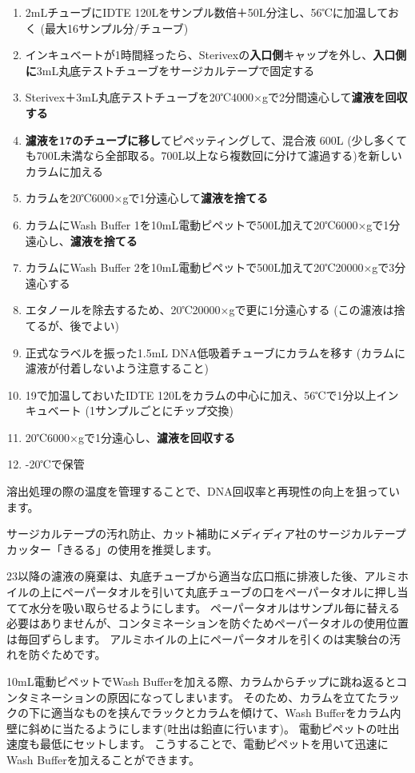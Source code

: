 \documentclass[titlepage,10pt,a4paper,uplatex]{jsbook}
\renewcommand{\textbf}[1]{{\bfseries\sffamily#1}}
\begin{document}
\begin{enumerate}
\item 2mLチューブにIDTE 120{\textmu}Lをサンプル数倍＋50{\textmu}L分注し、56℃に加温しておく (最大16サンプル分/チューブ)
\item インキュベートが1時間経ったら、Sterivexの\textbf{入口側}キャップを外し、\textbf{入口側に}3mL丸底テストチューブをサージカルテープで固定する
\item Sterivex＋3mL丸底テストチューブを20℃4000×gで2分間遠心して\textbf{濾液を回収する}
\item \textbf{濾液を17のチューブに移し}てピペッティングして、混合液 600{\textmu}L (少し多くても700{\textmu}L未満なら全部取る。700{\textmu}L以上なら複数回に分けて濾過する)を新しいカラムに加える
\item カラムを20℃6000×gで1分遠心して\textbf{濾液を捨てる}
\item カラムにWash Buffer 1を10mL電動ピペットで500{\textmu}L加えて20℃6000×gで1分遠心し、\textbf{濾液を捨てる}
\item カラムにWash Buffer 2を10mL電動ピペットで500{\textmu}L加えて20℃20000×gで3分遠心する
\item エタノールを除去するため、20℃20000×gで更に1分遠心する (この濾液は捨てるが、後でよい)
\item 正式なラベルを振った1.5mL DNA低吸着チューブにカラムを移す (カラムに濾液が付着しないよう注意すること)
\item 19で加温しておいたIDTE 120{\textmu}Lをカラムの中心に加え、56℃で1分以上インキュベート (1サンプルごとにチップ交換)
\item 20℃6000×gで1分遠心し、\textbf{濾液を回収する}
\item -20℃で保管
\end{enumerate}

溶出処理の際の温度を管理することで、DNA回収率と再現性の向上を狙っています。

サージカルテープの汚れ防止、カット補助にメディディア社のサージカルテープカッター「きるる」の使用を推奨します。

23以降の濾液の廃棄は、丸底チューブから適当な広口瓶に排液した後、アルミホイルの上にペーパータオルを引いて丸底チューブの口をペーパータオルに押し当てて水分を吸い取らせるようにします。
ペーパータオルはサンプル毎に替える必要はありませんが、コンタミネーションを防ぐためペーパータオルの使用位置は毎回ずらします。
アルミホイルの上にペーパータオルを引くのは実験台の汚れを防ぐためです。

10mL電動ピペットでWash Bufferを加える際、カラムからチップに跳ね返るとコンタミネーションの原因になってしまいます。
そのため、カラムを立てたラックの下に適当なものを挟んでラックとカラムを傾けて、Wash Bufferをカラム内壁に斜めに当たるようにします(吐出は鉛直に行います)。
電動ピペットの吐出速度も最低にセットします。
こうすることで、電動ピペットを用いて迅速にWash Bufferを加えることができます。
\end{document}
